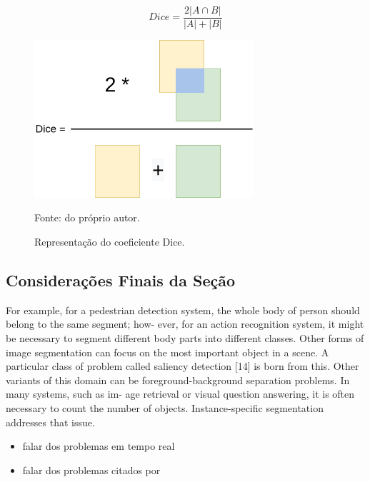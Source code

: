 \begin{equation}
    \label{semantic:eq:6}
    Dice = \frac{2|A \cap B|}{|A| + |B|}
\end{equation}

\begin{figure}[H]
    \centering
    \caption{Representação do coeficiente Dice.}
    \includegraphics[height=2.3in]{recursos/imagens/semantic/dice.png}
    \label{semantic:fig:2}

    \vspace*{1 cm}
    Fonte: do próprio autor.
\end{figure}


\subsection{Considerações Finais da Seção}
\label{semantic:conclusion}

For example, for a pedestrian detection system, the whole body of person should belong to the same segment; how- ever, for an action recognition system, it might be necessary to segment different body parts into different classes. Other forms of image segmentation can focus on the most important object in a scene. A particular class of problem called saliency detection [14] is born from this. Other variants of this domain can be foreground-background separation problems. In many systems, such as im- age retrieval or visual question answering, it is often necessary to count the number of objects. Instance-specific segmentation addresses that issue.

\begin{itemize}
    \item falar dos problemas em tempo real \cite{Yu2018}
    \item falar dos problemas citados por \cite{Kirillov2019a}
\end{itemize}
